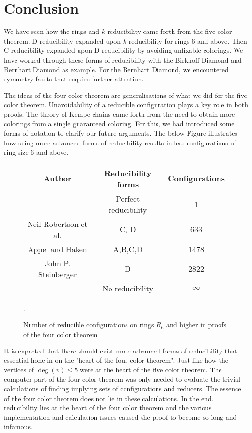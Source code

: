 \pagebreak
\section{Conclusion}

We have seen how the rings and $k$-reducibility came forth from the five color theorem. D-reducibility expanded upon $k$-reducibility for rings 6 and above. Then C-reducibility expanded upon D-reducibility by avoiding unfixable colorings. We have worked through these forms of reducibility with the Birkhoff Diamond and Bernhart Diamond as example. For the Bernhart Diamond, we encountered symmetry faults that require further attention.

The ideas of the four color theorem are generalisations of what we did for the five color theorem. Unavoidability of a reducible configuration plays a key role in both proofs. The theory of Kempe-chains came forth from the need to obtain more colorings from a single guaranteed coloring. For this, we had introduced some forms of notation to clarify our future arguments. The below Figure illustrates how using more advanced forms of reducibility results in less configurations of ring size 6 and above.

\begin{figure}[!h]
    \centering
    \begin{tabular}{c|c|c}
        Author & Reducibility forms & Configurations \\
        \hline
        & Perfect reducibility & 1 \\
        Neil Robertson et al. & C, D & 633 \\
        Appel and Haken & A,B,C,D & 1478 \\
        John P. Steinberger & D & 2822 \\
        & No reducibility & $\infty$
    \end{tabular}
    \caption{Number of reducible configurations on rings $R_6$ and higher in proofs of the four color theorem}.
\end{figure}

It is expected that there should exist more advanced forms of reducibility that essential hone in on the "heart of the four color theorem". Just like how the vertices of $\deg(v)\leq 5$ were at the heart of the five color theorem.  The computer part of the four color theorem was only needed to evaluate the trivial calculations of finding implying sets of configurations and reducers. The essence of the four color theorem does not lie in these calculations. In the end, reducibility lies at the heart of the four color theorem and the various implementation and calculation issues caused the proof to become so long and infamous.